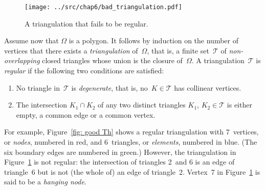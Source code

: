 \begin{figure}
\caption{A triangulation that fails to be regular.}\label{fig: bad Th}
\begin{center}
\texttt{[image: ../src/chap6/bad\_triangulation.pdf]} 
\end{center}
\end{figure}

Assume now that $\Omega$ is a polygon.  It follows by induction on the number 
of vertices that there exists a \emph{triangulation} of~$\Omega$, that is, a 
finite set~$\mathcal{T}$ of \emph{non-overlapping} closed triangles whose 
union is the closure of~$\Omega$. A triangulation~$\mathcal{T}$ is 
\emph{regular} if the following two conditions are satisfied:
\begin{enumerate}
\item No triangle in~$\mathcal{T}$ is \emph{degenerate}, that is, 
no~$K\in\mathcal{T}$ has collinear vertices.
\item The intersection $K_1\cap K_2$ of any two distinct triangles $K_1$, 
$K_2\in\mathcal{T}$ is either empty, a common edge or a common vertex.
\end{enumerate}
For example, Figure~\ref{fig: good Th} shows a regular triangulation with 
7~vertices, or \emph{nodes}, numbered in red, and 6~triangles, or 
\emph{elements}, numbered in blue.  (The six boundary edges are 
numbered in green.) However, the triangulation in 
Figure~\ref{fig: bad Th} is not regular: the intersection of triangles 2~and 6 
is an edge of triangle~6 but is not (the whole of) an edge of triangle~2.
Vertex~7 in Figure~\ref{fig: bad Th} is said to be a \emph{hanging node}.

